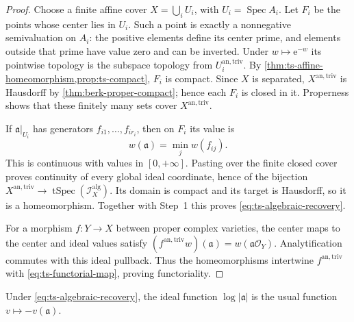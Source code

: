 \begin{proof}
Choose a finite affine cover $X=\bigcup_i U_i$, with
$U_i=\operatorname{Spec}A_i$. Let $F_i$ be the points whose center
lies in $U_i$. Such a point is exactly a nonnegative semivaluation
on $A_i$: the positive elements define its center prime, and
elements outside that prime have value zero and can be inverted.
Under $w\mapsto\mathrm{e}^{-w}$ its pointwise topology
is the subspace topology from $U_i^{\mathrm{an,triv}}$.
By \cref{thm:ts-affine-homeomorphism,prop:ts-compact}, $F_i$ is
compact. Since $X$ is separated, $X^{\mathrm{an,triv}}$ is
Hausdorff by \cref{thm:berk-proper-compact}; hence each $F_i$ is
closed in it. Properness shows that these finitely many sets cover
$X^{\mathrm{an,triv}}$.

If $\mathfrak a|_{U_i}$ has generators $f_{i1},\ldots,f_{ir_i}$,
then on $F_i$ its value is
\[
                     w(\mathfrak a)=\min_j w(f_{ij}).
\]
This is continuous with values in $[0,+\infty]$. Pasting over the
finite closed cover proves continuity of every global ideal
coordinate, hence of the bijection
$X^{\mathrm{an,triv}}\to\operatorname{tSpec}
(\mathscr I_X^{\mathrm{alg}})$. Its domain is compact and its
target is Hausdorff, so it is a homeomorphism. Together with
Step~1 this proves \eqref{eq:ts-algebraic-recovery}.

For a morphism $f:Y\to X$ between proper complex varieties,
the center maps to the center and ideal values satisfy
$(f^{\mathrm{an,triv}}w)(\mathfrak a)
=w(\mathfrak a\mathcal O_Y)$.
Analytification commutes with this ideal pullback. Thus the
homeomorphisms intertwine $f^{\mathrm{an,triv}}$ with
\eqref{eq:ts-functorial-map}, proving functoriality.
\end{proof}

Under \eqref{eq:ts-algebraic-recovery}, the ideal function
$\log|\mathfrak a|$ is the usual function
$v\mapsto-v(\mathfrak a)$.

